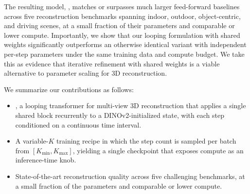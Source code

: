 The resulting model, \methodname, matches or surpasses much larger feed-forward baselines across five reconstruction benchmarks spanning indoor, outdoor, object-centric, and driving scenes, at a small fraction of their parameters and comparable or lower compute. Importantly, we show that our looping formulation with shared weights significantly outperforms an otherwise identical variant with independent per-step parameters under the same training data and compute budget. We take this as evidence that iterative refinement with shared weights is a viable alternative to parameter scaling for 3D reconstruction.

We summarize our contributions as follows:
\begin{itemize}
    \item \methodname, a looping transformer for multi-view 3D reconstruction that applies a single shared block recurrently to a DINOv2-initialized state, with each step conditioned on a continuous time interval.
    \item A variable-$K$ training recipe in which the step count is sampled per batch from $[K_\text{min}, K_\text{max}]$, yielding a single checkpoint that exposes compute as an inference-time knob.
    \item State-of-the-art reconstruction quality across five challenging benchmarks, at a small fraction of the parameters and comparable or lower compute.
\end{itemize}



